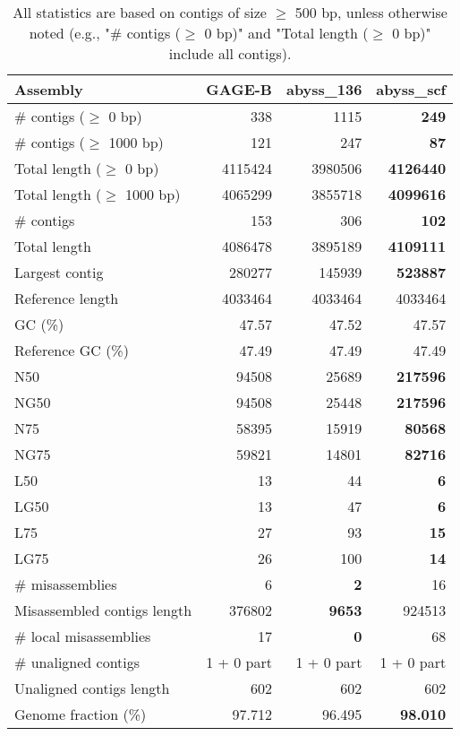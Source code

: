 \documentclass[12pt,a4paper]{article}
\begin{document}
\begin{table}[ht]
\begin{center}
\caption{All statistics are based on contigs of size $\geq$ 500 bp, unless otherwise noted (e.g., "\# contigs ($\geq$ 0 bp)" and "Total length ($\geq$ 0 bp)" include all contigs).}
\begin{tabular}{|l*{3}{|r}|}
\hline
Assembly & GAGE-B & abyss\_136 & abyss\_scf \\ \hline
\# contigs ($\geq$ 0 bp) & 338 & 1115 & {\bf 249} \\ \hline
\# contigs ($\geq$ 1000 bp) & 121 & 247 & {\bf 87} \\ \hline
Total length ($\geq$ 0 bp) & 4115424 & 3980506 & {\bf 4126440} \\ \hline
Total length ($\geq$ 1000 bp) & 4065299 & 3855718 & {\bf 4099616} \\ \hline
\# contigs & 153 & 306 & {\bf 102} \\ \hline
Total length & 4086478 & 3895189 & {\bf 4109111} \\ \hline
Largest contig & 280277 & 145939 & {\bf 523887} \\ \hline
Reference length & 4033464 & 4033464 & 4033464 \\ \hline
GC (\%) & 47.57 & 47.52 & 47.57 \\ \hline
Reference GC (\%) & 47.49 & 47.49 & 47.49 \\ \hline
N50 & 94508 & 25689 & {\bf 217596} \\ \hline
NG50 & 94508 & 25448 & {\bf 217596} \\ \hline
N75 & 58395 & 15919 & {\bf 80568} \\ \hline
NG75 & 59821 & 14801 & {\bf 82716} \\ \hline
L50 & 13 & 44 & {\bf 6} \\ \hline
LG50 & 13 & 47 & {\bf 6} \\ \hline
L75 & 27 & 93 & {\bf 15} \\ \hline
LG75 & 26 & 100 & {\bf 14} \\ \hline
\# misassemblies & 6 & {\bf 2} & 16 \\ \hline
Misassembled contigs length & 376802 & {\bf 9653} & 924513 \\ \hline
\# local misassemblies & 17 & {\bf 0} & 68 \\ \hline
\# unaligned contigs & 1 + 0 part & 1 + 0 part & 1 + 0 part \\ \hline
Unaligned contigs length & 602 & 602 & 602 \\ \hline
Genome fraction (\%) & 97.712 & 96.495 & {\bf 98.010} \\ \hline

\end{tabular}
\end{center}
\end{table}
\end{document}
